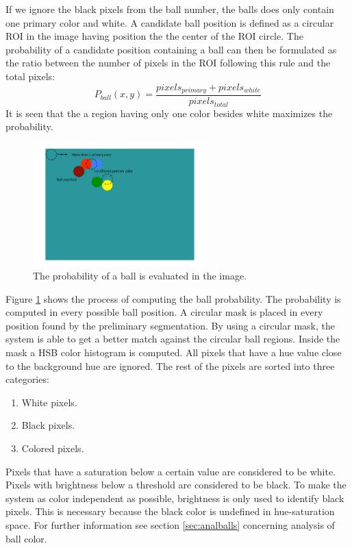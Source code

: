 If we ignore the black pixels from the ball number, the balls does only contain one primary color and white. A candidate ball position is defined as a circular ROI in the image having position the the center of the ROI circle.
The probability of a candidate position containing a ball can then be formulated as the ratio between the number of pixels in the ROI following this rule and the total pixels:
\begin{equation}
P_{ball}(x,y) = \frac{pixels_{primary} + pixels_{white}}{pixels_{total}}
\end{equation}
It is seen that the a region having only one color besides white maximizes the probability.
\begin{figure}[H]
\begin{center}
\includegraphics[width=0.6\textwidth]{images/ballfind.pdf}
\caption{The probability of a ball is evaluated in the image.}
\label{fig:ballfind}
\end{center}
\end{figure}
Figure \ref{fig:ballfind} shows the process of computing the ball probability. The probability is computed in every possible ball position.
A circular mask is placed in every position found by the preliminary segmentation. By using a circular mask, the system is able to get a better match against the circular ball regions. Inside the mask a HSB color histogram is computed. All pixels that have a hue value close to the background hue are ignored. The rest of the pixels are sorted into three categories: 
\begin{enumerate}
  \item White pixels.
  \item Black pixels.
  \item Colored pixels.
\end{enumerate}
Pixels that have a saturation below a certain value are considered to be white. Pixels with brightness below a threshold are considered to be black. To make the system as color independent as possible, brightness is only used to identify black pixels. This is necessary because the black color is undefined in hue-saturation space. For further information see section \ref{sec:analballs} concerning analysis of ball color.

